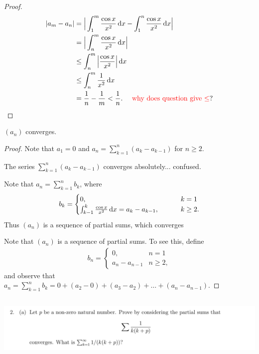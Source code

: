 \documentclass[12pt]{article}
\begin{document}
\begin{proof}
  \begin{align*}
    |a_m - a_n| &=    \Big| \int_1^m \frac{\cos x}{x^2} \dx - \int_1^n \frac{\cos x}{x^2} \dx \Big|\\
                &=    \Big| \int_n^m \frac{\cos x}{x^2} \dx \Big|\\
                &\leq \int_n^m \Big| \frac{\cos x}{x^2} \Big| \dx \\
                &\leq \int_n^m \frac{1}{x^2} \dx \\
                &= \frac{1}{n} - \frac{1}{m}
                < \frac{1}{n}. ~~~~\text{\red{why does question give $\leq$}?}
  \end{align*}
\end{proof}
\begin{claim*}
  $(a_n)$ converges.
\end{claim*}
\begin{proof}
  Note that $a_1 = 0$ and $a_n = \sum_{k=1}^n (a_{k} - a_{k-1})$ for $n \geq 2$.

  The series $\sum_{k=1}^n (a_{k} - a_{k-1})$ converges absolutely... confused.

  Note that $a_n = \sum_{k=1}^n b_k$, where
  \begin{align*}
    b_k =
    \begin{cases}
      0,     ~~~~~~~~~~~~~~&k = 1\\
      \int_{k-1}^k \frac{\cos x}{x^2} \dx = a_{k} - a_{k-1},   ~~~~~~~&k \geq 2.
    \end{cases}
  \end{align*}
  Thus $(a_n)$ is a sequence of partial sums, which converges

  Note that $(a_n)$ is a sequence of partial sums. To see this, define
  \begin{align*}
    b_n =
    \begin{cases}
      0,     ~~~~~~~&n = 1\\
      a_n - a_{n-1}  &n \geq 2,
    \end{cases}
  \end{align*}
  and observe that $a_n = \sum_{k=1}^n b_k = 0 + (a_2 - 0) + (a_3 - a_2) + \ldots + (a_n - a_{n - 1})$.

\end{proof}

\newpage
\subsection{}
\begin{mdframed}
\includegraphics[width=400pt]{img/analysis--oxford-M2-I-5-2-a.png}
\end{mdframed}
\end{document}
